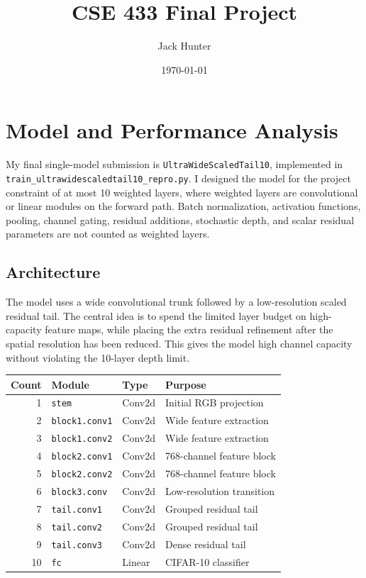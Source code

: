 \documentclass[11pt]{article}
\title{CSE 433 Final Project}
\author{Jack Hunter}
\date{\today}
\newcommand{\reprofile}{\texttt{train\_}\allowbreak\texttt{ultrawidescaledtail10\_}\allowbreak\texttt{repro.py}}
\begin{document}
\maketitle

\section{Model and Performance Analysis}

My final single-model submission is \texttt{UltraWideScaledTail10}, implemented in
\reprofile. I designed the model for the project
constraint of at most 10 weighted layers, where weighted layers are convolutional or
linear modules on the forward path. Batch normalization, activation functions, pooling,
channel gating, residual additions, stochastic depth, and scalar residual parameters are
not counted as weighted layers.

\subsection{Architecture}

The model uses a wide convolutional trunk followed by a low-resolution scaled residual
tail. The central idea is to spend the limited layer budget on high-capacity feature
maps, while placing the extra residual refinement after the spatial resolution has been
reduced. This gives the model high channel capacity without violating the 10-layer
depth limit.

\begin{center}
\begin{tabular}{rlll}
\toprule
\textbf{Count} & \textbf{Module} & \textbf{Type} & \textbf{Purpose} \\
\midrule
1 & \texttt{stem} & Conv2d & Initial RGB projection \\
2 & \texttt{block1.conv1} & Conv2d & Wide feature extraction \\
3 & \texttt{block1.conv2} & Conv2d & Wide feature extraction \\
4 & \texttt{block2.conv1} & Conv2d & 768-channel feature block \\
5 & \texttt{block2.conv2} & Conv2d & 768-channel feature block \\
6 & \texttt{block3.conv} & Conv2d & Low-resolution transition \\
7 & \texttt{tail.conv1} & Conv2d & Grouped residual tail \\
8 & \texttt{tail.conv2} & Conv2d & Grouped residual tail \\
9 & \texttt{tail.conv3} & Conv2d & Dense residual tail \\
10 & \texttt{fc} & Linear & CIFAR-10 classifier \\
\bottomrule
\end{tabular}
\end{center}
\end{document}
